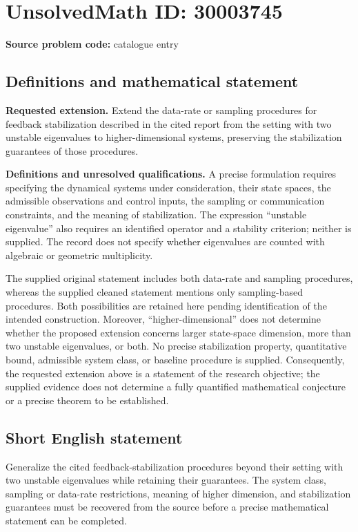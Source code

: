 \documentclass[11pt]{article}
\begin{document}
\section*{UnsolvedMath ID: 30003745}
\textbf{Source problem code:} catalogue entry
\subsection{Definitions and mathematical statement}
\textbf{Requested extension.} Extend the data-rate or sampling procedures for feedback stabilization described in the cited report from the setting with two unstable eigenvalues to higher-dimensional systems, preserving the stabilization guarantees of those procedures.

\textbf{Definitions and unresolved qualifications.} A precise formulation requires specifying the dynamical systems under consideration, their state spaces, the admissible observations and control inputs, the sampling or communication constraints, and the meaning of stabilization. The expression ``unstable eigenvalue'' also requires an identified operator and a stability criterion; neither is supplied. The record does not specify whether eigenvalues are counted with algebraic or geometric multiplicity.

The supplied original statement includes both data-rate and sampling procedures, whereas the supplied cleaned statement mentions only sampling-based procedures. Both possibilities are retained here pending identification of the intended construction. Moreover, ``higher-dimensional'' does not determine whether the proposed extension concerns larger state-space dimension, more than two unstable eigenvalues, or both. No precise stabilization property, quantitative bound, admissible system class, or baseline procedure is supplied. Consequently, the requested extension above is a statement of the research objective; the supplied evidence does not determine a fully quantified mathematical conjecture or a precise theorem to be established.
\subsection{Short English statement}
Generalize the cited feedback-stabilization procedures beyond their setting with two unstable eigenvalues while retaining their guarantees. The system class, sampling or data-rate restrictions, meaning of higher dimension, and stabilization guarantees must be recovered from the source before a precise mathematical statement can be completed.
\end{document}
